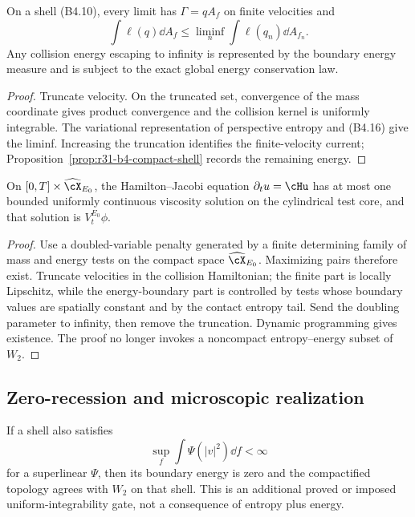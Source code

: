 \begin{proposition}
\label{prop:r31-b4-closure}
On a shell (B4.10), every limit has
$\Gamma=qA_f$ on finite velocities and
\[
 \int\ell(q)\dd A_f\le
 \liminf_n\int\ell(q_n)\dd A_{f_n}.                       \tag{B4.17}
\]
Any collision energy escaping to infinity is represented by the boundary
energy measure and is subject to the exact global energy conservation law.
\end{proposition}

\begin{proof}
Truncate velocity.  On the truncated set, convergence of the mass coordinate
gives product convergence and the collision kernel is uniformly integrable.
The variational representation of perspective entropy and (B4.16) give the
liminf.  Increasing the truncation identifies the finite-velocity current;
Proposition~\ref{prop:r31-b4-compact-shell} records the remaining energy.
\end{proof}

\begin{theorem}
\label{thm:r31-b4-comparison}
On $[0,T]\times\widehat\cX_{E_0}$, the Hamilton--Jacobi equation
$\partial_tu=\cHu$ has at most one bounded uniformly continuous viscosity
solution on the cylindrical test core, and that solution is
$V_t^{E_0}\phi$.
\end{theorem}

\begin{proof}
Use a doubled-variable penalty generated by a finite determining family of
mass and energy tests on the compact space
$\widehat\cX_{E_0}$.  Maximizing pairs therefore exist.  Truncate velocities
in the collision Hamiltonian; the finite part is locally Lipschitz, while the
energy-boundary part is controlled by tests whose boundary values are
spatially constant and by the contact entropy tail.  Send the doubling
parameter to infinity, then remove the truncation.  Dynamic programming gives
existence.  The proof no longer invokes a noncompact entropy--energy subset of
$W_2$.
\end{proof}

\subsection{Zero-recession and microscopic realization}

If a shell also satisfies
\[
 \sup_f\int\Psi(|v|^2)\dd f<\infty                       \tag{B4.18}
\]
for a superlinear $\Psi$, then its boundary energy is zero and the compactified
topology agrees with $W_2$ on that shell.  This is an additional proved or
imposed uniform-integrability gate, not a consequence of entropy plus energy.

